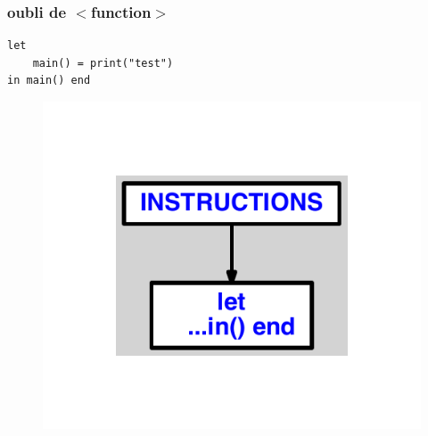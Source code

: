 \documentclass{article}
\begin{document}
\subsubsection{oubli de $ < $function$ > $}
\begin{lstlisting}
let
	main() = print("test")
in main() end
\end{lstlisting}
\newpage
\begin{figure}[H]
\centering
\includegraphics[max width=\textwidth]{ast/ast_214.pdf}
\end{figure}
\newpage
\end{document}
